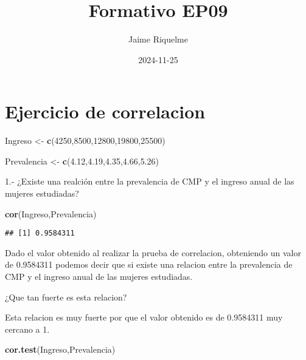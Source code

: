 \documentclass[
]{article}
\title{Formativo EP09}
\author{Jaime Riquelme}
\date{2024-11-25}
\newenvironment{Shaded}{\begin{snugshade}}{\end{snugshade}}
\newcommand{\DecValTok}[1]{\textcolor[rgb]{0.00,0.00,0.81}{#1}}
\newcommand{\FloatTok}[1]{\textcolor[rgb]{0.00,0.00,0.81}{#1}}
\newcommand{\FunctionTok}[1]{\textcolor[rgb]{0.13,0.29,0.53}{\textbf{#1}}}
\newcommand{\NormalTok}[1]{#1}
\newcommand{\OtherTok}[1]{\textcolor[rgb]{0.56,0.35,0.01}{#1}}
\begin{document}
\maketitle

\section{Ejercicio de correlacion}\label{ejercicio-de-correlacion}

\begin{Shaded}
\begin{Highlighting}[]
\NormalTok{Ingreso }\OtherTok{\textless{}{-}} \FunctionTok{c}\NormalTok{(}\DecValTok{4250}\NormalTok{,}\DecValTok{8500}\NormalTok{,}\DecValTok{12800}\NormalTok{,}\DecValTok{19800}\NormalTok{,}\DecValTok{25500}\NormalTok{)}

\NormalTok{Prevalencia }\OtherTok{\textless{}{-}} \FunctionTok{c}\NormalTok{(}\FloatTok{4.12}\NormalTok{,}\FloatTok{4.19}\NormalTok{,}\FloatTok{4.35}\NormalTok{,}\FloatTok{4.66}\NormalTok{,}\FloatTok{5.26}\NormalTok{)}
\end{Highlighting}
\end{Shaded}

1.- ¿Existe una realción entre la prevalencia de CMP y el ingreso anual
de las mujeres estudiadas?

\begin{Shaded}
\begin{Highlighting}[]
\FunctionTok{cor}\NormalTok{(Ingreso,Prevalencia)}
\end{Highlighting}
\end{Shaded}

\begin{verbatim}
## [1] 0.9584311
\end{verbatim}

Dado el valor obtenido al realizar la prueba de correlacion, obteniendo
un valor de 0.9584311 podemos decir que si existe una relacion entre la
prevalencia de CMP y el ingreso anual de las mujeres estudiadas.

¿Que tan fuerte es esta relacion?

Esta relacion es muy fuerte por que el valor obtenido es de 0.9584311
muy cercano a 1.

\begin{Shaded}
\begin{Highlighting}[]
\FunctionTok{cor.test}\NormalTok{(Ingreso,Prevalencia)}
\end{Highlighting}
\end{Shaded}
\end{document}
